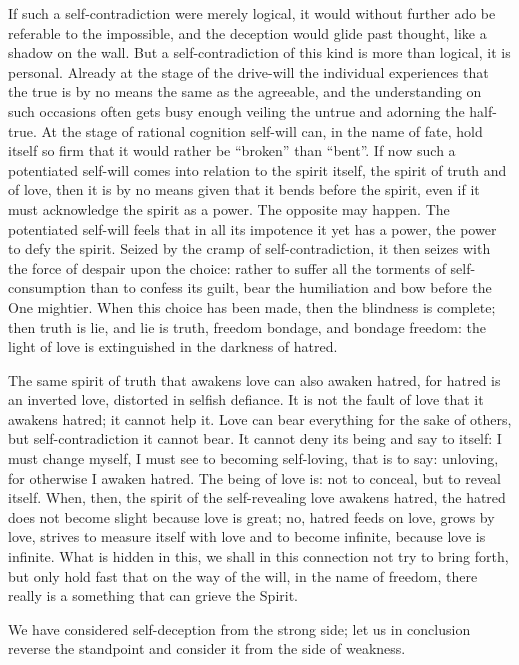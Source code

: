 \documentclass[12pt,a4paper,openany]{book}
\newcommand{\opage}[1]{\marginnote{\footnotesize\textit{[#1]}}}
\begin{document}
If such a self-contradiction were merely logical,
it would without further ado be referable to the impossible,
\setcounter{footnote}{0}%
\opage{58}and the deception would glide past thought, like a shadow on the wall.
But a self-contradiction of this kind is more than logical,
it is personal. Already at the stage of the drive-will the
individual experiences that the true is by no means the
same as the agreeable, and the understanding on such
occasions often gets busy enough veiling the untrue
and adorning the half-true. At the stage of rational cognition
self-will can, in the name of fate, hold itself so
firm that it would rather be ``broken'' than ``bent''. If
now such a potentiated self-will comes into relation to the spirit
itself, the spirit of truth and of love, then it is by no means
given that it bends before the spirit, even if it
must acknowledge the spirit as a power. The opposite may happen.
The potentiated self-will feels that in all its impotence it
yet has a power, the power to defy the spirit. Seized by
the cramp of self-contradiction, it then seizes with the force of despair
upon the choice: rather to suffer all the torments of self-consumption
than to confess its guilt, bear the humiliation and bow
before the One mightier. When this choice has been made, then
the blindness is complete; then truth is lie, and lie is
truth, freedom bondage, and bondage freedom: the light of love
is extinguished in the darkness of hatred.

The same spirit of truth that awakens love
can also awaken hatred, for hatred is an inverted love, distorted in selfish
defiance. It is not the fault of love
that it awakens hatred; it cannot help it.
Love can bear everything for the sake of others, but self-contradiction
it cannot bear. It cannot deny
its being and say to itself: I must change myself, I
must see to becoming self-loving, that is to say: unloving, for
otherwise I awaken hatred. The being of love is: not to
conceal, but to reveal itself. When, then, the spirit of
the self-revealing love awakens hatred, the hatred
does not become slight because love is great; no, hatred feeds
on love, grows by love, strives to
measure itself with love and to become infinite, because
love is infinite. What is hidden in this, we shall in
\setcounter{footnote}{0}%
\opage{59}this connection not try to bring forth, but only
hold fast that on the way of the will, in the name of freedom,
there really is a something that can grieve the Spirit.

We have considered self-deception from the strong side;
let us in conclusion reverse the standpoint and consider it
from the side of weakness.
\end{document}
